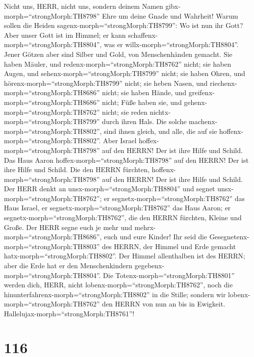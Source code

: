  Nicht uns, HERR, nicht uns, sondern deinem Namen
gibx-morph=``strongMorph:TH8798'' Ehre um deine Gnade und Wahrheit!
 Warum sollen die Heiden
sagenx-morph=``strongMorph:TH8799'': Wo ist nun ihr Gott? 
Aber unser Gott ist im Himmel; er kann
schaffenx-morph=``strongMorph:TH8804'', was er
willx-morph=``strongMorph:TH8804''.  Jener Götzen aber sind
Silber und Gold, von Menschenhänden gemacht.  Sie haben
Mäuler, und redenx-morph=``strongMorph:TH8762'' nicht; sie haben Augen,
und sehenx-morph=``strongMorph:TH8799'' nicht;  sie haben
Ohren, und hörenx-morph=``strongMorph:TH8799'' nicht; sie heben Nasen,
und riechenx-morph=``strongMorph:TH8686'' nicht;  sie haben
Hände, und greifenx-morph=``strongMorph:TH8686'' nicht; Füße haben sie,
und gehenx-morph=``strongMorph:TH8762'' nicht; sie reden
nichtx-morph=``strongMorph:TH8799'' durch ihren Hals.  Die
solche machenx-morph=``strongMorph:TH8802'', sind ihnen gleich, und
alle, die auf sie hoffenx-morph=``strongMorph:TH8802''. 
Aber Israel hoffex-morph=``strongMorph:TH8798'' auf den HERRN! Der ist
ihre Hilfe und Schild.  Das Haus Aaron
hoffex-morph=``strongMorph:TH8798'' auf den HERRN! Der ist ihre Hilfe
und Schild.  Die den HERRN fürchten,
hoffenx-morph=``strongMorph:TH8798'' auf den HERRN! Der ist ihre Hilfe
und Schild.  Der HERR denkt an
unsx-morph=``strongMorph:TH8804'' und segnet
unsx-morph=``strongMorph:TH8762''; er
segnetx-morph=``strongMorph:TH8762'' das Haus Israel, er
segnetx-morph=``strongMorph:TH8762'' das Haus Aaron;  er
segnetx-morph=``strongMorph:TH8762'', die den HERRN fürchten, Kleine und
Große.  Der HERR segne euch je mehr und
mehrx-morph=``strongMorph:TH8686'', euch und eure Kinder! 
Ihr seid die Gesegnetenx-morph=``strongMorph:TH8803'' des HERRN, der
Himmel und Erde gemacht hatx-morph=``strongMorph:TH8802''. 
Der Himmel allenthalben ist des HERRN; aber die Erde hat er den
Menschenkindern gegebenx-morph=``strongMorph:TH8804''.  Die
Totenx-morph=``strongMorph:TH8801'' werden dich, HERR, nicht
lobenx-morph=``strongMorph:TH8762'', noch die
hinunterfahrenx-morph=``strongMorph:TH8802'' in die Stille;
 sondern wir lobenx-morph=``strongMorph:TH8762'' den HERRN
von nun an bis in Ewigkeit. Hallelujax-morph=``strongMorph:TH8761''!

\hypertarget{section-115}{%
\section{116}\label{section-115}}

